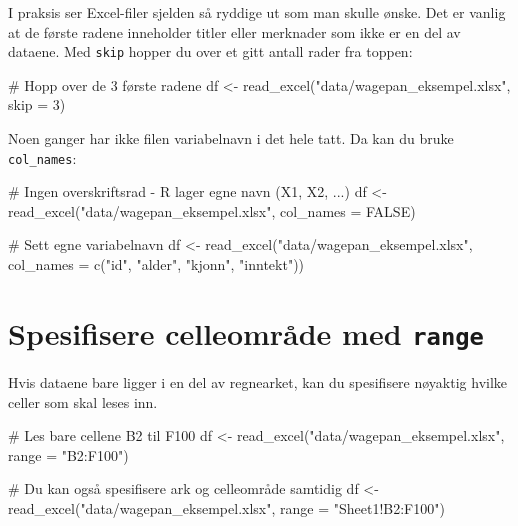 \documentclass[
  norsk,
  letterpaper,
  DIV=11,
  numbers=noendperiod]{scrreprt}
\newenvironment{Shaded}{\begin{snugshade}}{\end{snugshade}}
\newcommand{\AttributeTok}[1]{\textcolor[rgb]{0.40,0.45,0.13}{#1}}
\newcommand{\CommentTok}[1]{\textcolor[rgb]{0.37,0.37,0.37}{#1}}
\newcommand{\ConstantTok}[1]{\textcolor[rgb]{0.56,0.35,0.01}{#1}}
\newcommand{\DecValTok}[1]{\textcolor[rgb]{0.68,0.00,0.00}{#1}}
\newcommand{\FunctionTok}[1]{\textcolor[rgb]{0.28,0.35,0.67}{#1}}
\newcommand{\NormalTok}[1]{\textcolor[rgb]{0.00,0.23,0.31}{#1}}
\newcommand{\OtherTok}[1]{\textcolor[rgb]{0.00,0.23,0.31}{#1}}
\newcommand{\StringTok}[1]{\textcolor[rgb]{0.13,0.47,0.30}{#1}}
\theoremstyle{definition}
\theoremstyle{remark}
\begin{document}
I praksis ser Excel-filer sjelden så ryddige ut som man skulle ønske.
Det er vanlig at de første radene inneholder titler eller merknader som
ikke er en del av dataene. Med \texttt{skip} hopper du over et gitt
antall rader fra toppen:

\begin{Shaded}
\begin{Highlighting}[]
\CommentTok{\# Hopp over de 3 første radene}
\NormalTok{df }\OtherTok{\textless{}{-}} \FunctionTok{read\_excel}\NormalTok{(}\StringTok{"data/wagepan\_eksempel.xlsx"}\NormalTok{, }\AttributeTok{skip =} \DecValTok{3}\NormalTok{)}
\end{Highlighting}
\end{Shaded}

Noen ganger har ikke filen variabelnavn i det hele tatt. Da kan du bruke
\texttt{col\_names}:

\begin{Shaded}
\begin{Highlighting}[]
\CommentTok{\# Ingen overskriftsrad {-} R lager egne navn (X1, X2, ...)}
\NormalTok{df }\OtherTok{\textless{}{-}} \FunctionTok{read\_excel}\NormalTok{(}\StringTok{"data/wagepan\_eksempel.xlsx"}\NormalTok{, }\AttributeTok{col\_names =} \ConstantTok{FALSE}\NormalTok{)}

\CommentTok{\# Sett egne variabelnavn}
\NormalTok{df }\OtherTok{\textless{}{-}} \FunctionTok{read\_excel}\NormalTok{(}\StringTok{"data/wagepan\_eksempel.xlsx"}\NormalTok{,}
                 \AttributeTok{col\_names =} \FunctionTok{c}\NormalTok{(}\StringTok{"id"}\NormalTok{, }\StringTok{"alder"}\NormalTok{, }\StringTok{"kjonn"}\NormalTok{, }\StringTok{"inntekt"}\NormalTok{))}
\end{Highlighting}
\end{Shaded}

\section{\texorpdfstring{Spesifisere celleområde med
\texttt{range}}{Spesifisere celleområde med range}}\label{spesifisere-celleomruxe5de-med-range}

Hvis dataene bare ligger i en del av regnearket, kan du spesifisere
nøyaktig hvilke celler som skal leses inn.

\begin{Shaded}
\begin{Highlighting}[]
\CommentTok{\# Les bare cellene B2 til F100}
\NormalTok{df }\OtherTok{\textless{}{-}} \FunctionTok{read\_excel}\NormalTok{(}\StringTok{"data/wagepan\_eksempel.xlsx"}\NormalTok{, }\AttributeTok{range =} \StringTok{"B2:F100"}\NormalTok{)}

\CommentTok{\# Du kan også spesifisere ark og celleområde samtidig}
\NormalTok{df }\OtherTok{\textless{}{-}} \FunctionTok{read\_excel}\NormalTok{(}\StringTok{"data/wagepan\_eksempel.xlsx"}\NormalTok{, }\AttributeTok{range =} \StringTok{"Sheet1!B2:F100"}\NormalTok{)}
\end{Highlighting}
\end{Shaded}
\end{document}
